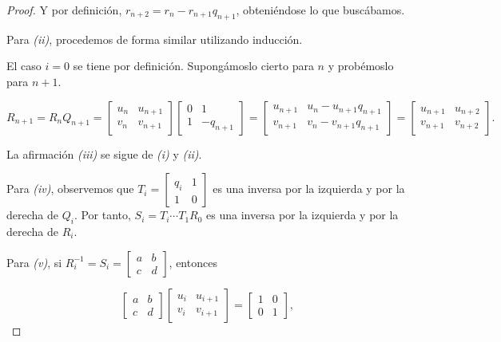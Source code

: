 \begin{lema}
\begin{proof}
Y por definición, $r_{n+2} = r_n - r_{n+1}q_{n+1}$, obteniéndose lo que buscábamos.

Para \textit{(ii)}, procedemos de forma similar utilizando inducción.

El caso $i = 0$ se tiene por definición. Supongámoslo cierto para $n$ y probémoslo para $n+1$.

\begin{equation}
R_{n+1} = R_nQ_{n+1} = \begin{bmatrix}
    u_n & u_{n+1} \\
    v_n & v_{n+1}
\end{bmatrix}\begin{bmatrix}
    0 & 1 \\
    1 & -q_{n+1}
\end{bmatrix} = \begin{bmatrix}
    u_{n+1} & u_n - u_{n+1}q_{n+1} \\
    v_{n+1} & v_n - v_{n+1}q_{n+1} 
\end{bmatrix} = \begin{bmatrix}
    u_{n+1} & u_{n+2} \\
    v_{n+1} & v_{n+2}
\end{bmatrix} .
\end{equation}

La afirmación \textit{(iii)} se sigue de \textit{(i)} y \textit{(ii)}.

Para \textit{(iv)}, observemos que $T_i = \begin{bmatrix}
    q_i & 1 \\
    1 & 0
\end{bmatrix}$ es una inversa por la izquierda y por la derecha de $Q_i$. Por tanto, $S_i = T_i \cdots T_1R_0$ es una inversa por la izquierda y por la derecha de $R_i$.

Para \textit{(v)}, si $R_i^{-1} = S_i = \begin{bmatrix}
    a & b \\
    c & d 
\end{bmatrix}$, entonces

$$ \begin{bmatrix}
    a & b \\
    c & d 
\end{bmatrix}\begin{bmatrix}
u_i & u_{i+1} \\
v_i & v_{i+1}
\end{bmatrix} = \begin{bmatrix}
    1 & 0 \\
    0 & 1
    \end{bmatrix}, $$


\end{proof}
\end{lema}

